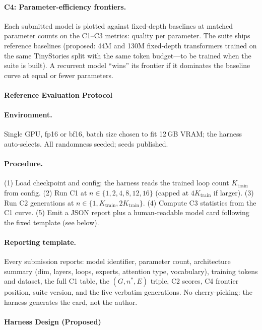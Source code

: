 \paragraph{C4: Parameter-efficiency frontiers.} Each submitted model is
plotted against fixed-depth baselines at matched parameter counts on
the C1--C3 metrics: quality per parameter. The suite ships reference
baselines (proposed: 44M and 130M fixed-depth transformers trained on
the same TinyStories split with the same token budget---to be trained
when the suite is built). A recurrent model ``wins'' its frontier if
it dominates the baseline curve at equal or fewer parameters.

\paragraph{Reference Evaluation Protocol}

\paragraph{Environment.} Single GPU, fp16 or bf16, batch size chosen
to fit 12\,GB VRAM; the harness auto-selects. All randomness seeded;
seeds published.

\paragraph{Procedure.} (1) Load checkpoint and config; the harness
reads the trained loop count $K_{\mathrm{train}}$ from config.
(2) Run C1 at $n \in \{1,2,4,8,12,16\}$ (capped at $4K_{\mathrm{train}}$
if larger). (3) Run C2 generations at $n \in \{1, K_{\mathrm{train}},
2K_{\mathrm{train}}\}$. (4) Compute C3 statistics from the C1 curve.
(5) Emit a JSON report plus a human-readable model card following the
fixed template (see below).

\paragraph{Reporting template.} Every submission reports: model
identifier, parameter count, architecture summary (dim, layers,
loops, experts, attention type, vocabulary), training tokens and
dataset, the full C1 table, the $(G, n^*, E)$ triple, C2 scores,
C4 frontier position, suite version, and the five verbatim
generations. No cherry-picking: the harness generates the card, not
the author.

\paragraph{Harness Design (Proposed)}

